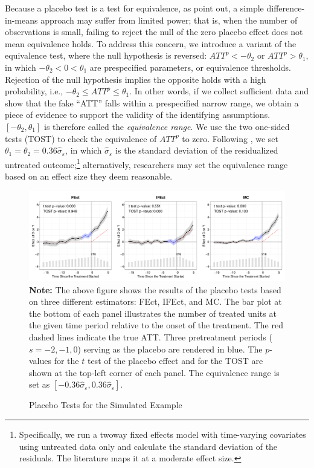 \documentclass[12pt]{article}
\let\oldcenter\center
\let\oldendcenter\endcenter
\renewenvironment{center}{\setlength\topsep{0pt}\oldcenter}{\oldendcenter}
\begin{document}
Because a placebo test is a test for equivalence, as \citet{hartman2018equivalence} point out, a simple difference-in-means approach may suffer from limited power; that is, when the number of observations is small, failing to reject the null of the zero placebo effect does not mean equivalence holds. To address this concern, we introduce a variant of the equivalence test, where the null hypothesis is reversed:
\begin{center}
$ATT^{p} < -\theta_2$ or $ATT^{p} > \theta_1$,
\end{center}
in which $-\theta_{2} < 0 < \theta_1$ are prespecified parameters, or equivalence thresholds. Rejection of the null hypothesis implies the opposite holds with a high probability, i.e., $-\theta_2 \leq ATT^{p} \leq \theta_1$. In other words, if we collect sufficient data and show that the fake ``ATT'' falls within a prespecified narrow range, we obtain a piece of evidence to support the validity of the identifying assumptions. $[-\theta_{2}, \theta_{1}]$ is therefore called the \emph{equivalence range}. 
We use the two one-sided tests (TOST) to check the equivalence of $ATT^{p}$ to zero. Following \citet{hartman2018equivalence}, we set $\theta_1 = \theta_2 = 0.36\hat\sigma_{\varepsilon}$, in which $\hat\sigma_{\varepsilon}$ is the standard deviation of the residualized untreated outcome;\footnote{Specifically, we run a twoway fixed effects model with time-varying covariates using untreated data only and calculate the standard deviation of the residuals. The literature maps it at a moderate effect size.} alternatively, researchers may set the equivalence range based on an effect size they deem reasonable. 

\begin{figure}[!ht]
\caption{Placebo Tests for the Simulated Example}\label{fg:placebo}
\centering
\begin{minipage}{1\linewidth}{\centering
\includegraphics[width = 1\textwidth]{sim0_placebo.pdf}\\}
 \footnotesize\textbf{Note:} The above figure shows the results of the placebo tests based on three different estimators: FEct, IFEct, and MC. The bar plot at the bottom of each panel illustrates the number of treated units at the given time period relative to the onset of the treatment. The red dashed lines indicate the true ATT. Three pretreatment periods ($s = -2, -1, 0$) serving as the placebo are rendered in blue. The $p$-values for the $t$ test of the placebo effect and for the TOST are shown at the top-left corner of each panel. The equivalence range is set as $[-0.36\hat\sigma_{\varepsilon}, 0.36\hat\sigma_{\varepsilon}]$.
\end{minipage}
\end{figure}
\end{document}
